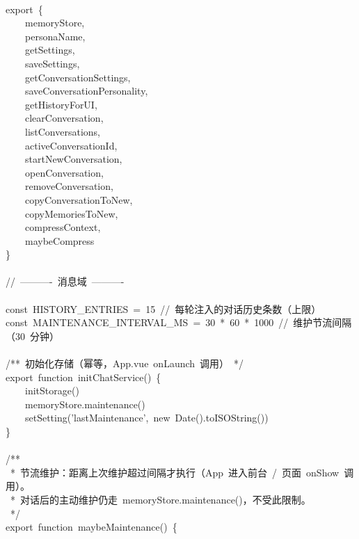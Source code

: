\documentclass[a4paper,10pt]{article}
\begin{document}
{\ttfamily\footnotesize\raggedright
\mbox{}\\
export~\{\\
~~~~memoryStore,\\
~~~~personaName,\\
~~~~getSettings,\\
~~~~saveSettings,\\
~~~~getConversationSettings,\\
~~~~saveConversationPersonality,\\
~~~~getHistoryForUI,\\
~~~~clearConversation,\\
~~~~listConversations,\\
~~~~activeConversationId,\\
~~~~startNewConversation,\\
~~~~openConversation,\\
~~~~removeConversation,\\
~~~~copyConversationToNew,\\
~~~~copyMemoriesToNew,\\
~~~~compressContext,\\
~~~~maybeCompress\\
\}\\
\mbox{}\\
//~----------~消息域~----------\\
\mbox{}\\
const~HISTORY\_ENTRIES~=~15~//~每轮注入的对话历史条数（上限）\\
const~MAINTENANCE\_INTERVAL\_MS~=~30~*~60~*~1000~//~维护节流间隔（30~分钟）\\
\mbox{}\\
/**~初始化存储（幂等，App.vue~onLaunch~调用）~*/\\
export~function~initChatService()~\{\\
~~~~initStorage()\\
~~~~memoryStore.maintenance()\\
~~~~setSetting('lastMaintenance',~new~Date().toISOString())\\
\}\\
\mbox{}\\
/**\\
~*~节流维护：距离上次维护超过间隔才执行（App~进入前台~/~页面~onShow~调用）。\\
~*~对话后的主动维护仍走~memoryStore.maintenance()，不受此限制。\\
~*/\\
export~function~maybeMaintenance()~\{\\
}
\end{document}
